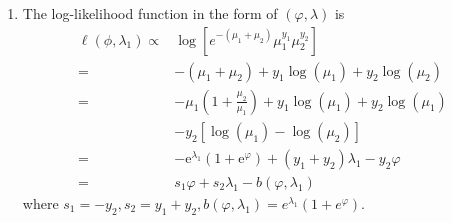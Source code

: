 \begin{solution}
    \begin{enumerate}
        \item
              The log-likelihood function in the form of $\left(\varphi,\lambda\right)$ is
              \begin{equation*}
                  \begin{aligned}
                      \ell\left(\phi,\lambda_{1}\right)\propto & \log\left[e^{-\left(\mu_{1}+\mu_{2}\right)}\mu_{1}^{y_{1}}\mu_{2}^{y_{2}}\right]                              \\
                      =                                        & -\left(\mu_{1}+\mu_{2}\right)+y_{1}\log\left(\mu_{1}\right)+y_{2}\log\left(\mu_{2}\right)                     \\
                      =                                        & -\mu_{1}\left(1+\frac{\mu_{2}}{\mu_{1}}\right)+y_{1}\log\left(\mu_{1}\right)+y_{2}\log\left(\mu_{1}\right)    \\
                                                               & -y_{2}\left[\log\left(\mu_{1}\right)-\log\left(\mu_{2}\right)\right]                                          \\
                      =                                        & -\mathrm{e}^{\lambda_{1}}\left(1+\mathrm{e}^{\varphi}\right)+\left(y_{1}+y_{2}\right)\lambda_{1}-y_{2}\varphi \\
                      =                                        & s_{1}\varphi+s_{2}\lambda_{1}-b\left(\varphi,\lambda_{1}\right)
                  \end{aligned}
              \end{equation*}
              where $s_{1}=-y_{2},s_{2}=y_{1}+y_{2},b\left(\varphi,\lambda_{1}\right)=e^{\lambda_{1}}\left(1+e^{\varphi}\right)$.


\end{enumerate}
\end{solution}

